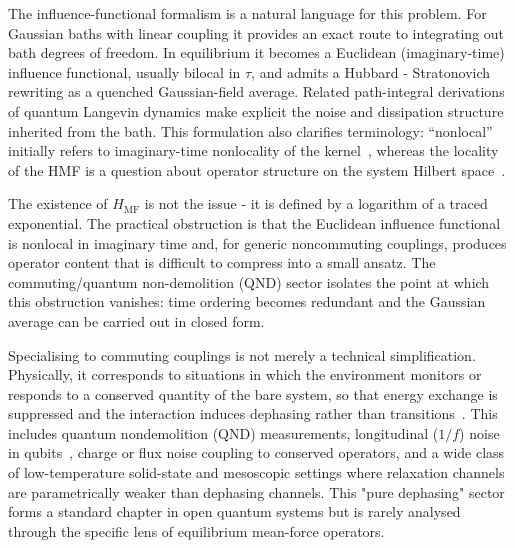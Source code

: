 The influence-functional formalism is a natural language for this problem.
For Gaussian baths with linear coupling it provides an exact route to
integrating out bath degrees of freedom\cite{feynmanTheoryGeneralQuantum1963a,caldeiraQuantumTunnellingDissipative1983a,grabertQuantumBrownianMotion1988}.
In equilibrium it becomes a Euclidean (imaginary-time) influence functional,
usually bilocal in $\tau$, and admits a Hubbard - Stratonovich rewriting as a
quenched Gaussian-field average\cite{hubbardCalculationPartitionFunctions1959a,stratonovich1957QDistro,stockburgerExactNumberRepresentation2002}.
Related path-integral derivations of quantum Langevin dynamics make explicit the
noise and dissipation structure inherited from the bath\cite{kleinertQuantumLangevinEquation1995,vankampenDerivationQuantumLangevin1997}.
This formulation also clarifies terminology: ``nonlocal'' initially refers to
imaginary-time nonlocality of the kernel~\cite{feynmanTheoryGeneralQuantum1963a,grabertQuantumBrownianMotion1988}, whereas the locality of the HMF is a
question about operator structure on the system Hilbert space~\cite{burkeStructureHamiltonianMean2024}.

The existence of $H_{\mathrm{MF}}$ is not the issue - it is defined by
a logarithm of a traced exponential. The practical obstruction is that the
Euclidean influence functional is nonlocal in imaginary time and, for generic
noncommuting couplings, produces operator content that is difficult to compress
into a small ansatz. The commuting/quantum non-demolition (QND) sector isolates the point at which this obstruction vanishes: time ordering becomes redundant and the Gaussian average
can be carried out in closed form. 

Specialising to commuting couplings is not merely a technical simplification.
Physically, it corresponds to situations in which the environment monitors or
responds to a conserved quantity of the bare system, so that energy exchange is
suppressed and the interaction induces dephasing rather than
transitions~\cite{breuerTheoryOpenQuantum2002}. This
includes quantum nondemolition (QND) measurements, longitudinal ($1/f$) noise in qubits~\cite{makhlinQuantumStateEngineering2001,palmaQuantumComputersDissipation1996},
charge or flux noise coupling to conserved operators, and a wide class of
low-temperature solid-state and mesoscopic settings where relaxation channels
are parametrically weaker than dephasing channels. This "pure dephasing"
sector~\cite{clerkIntroductionQuantumNoise2010} forms a standard chapter in open
quantum systems but is rarely analysed through the specific lens of equilibrium
mean-force operators.

